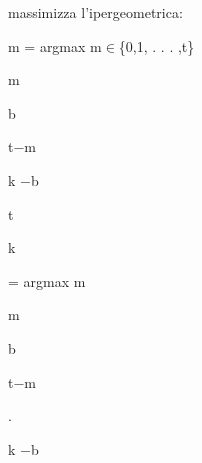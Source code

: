 \documentclass[a4paper,portrait,12pt]{article}
\begin{document}
\begin{flushleft}
massimizza l'ipergeometrica:
\end{flushleft}


\begin{flushleft}
m = argmax m$\in$\{0,1, . . . ,t\}
\end{flushleft}





\begin{flushleft}
m
\end{flushleft}


\begin{flushleft}
b
\end{flushleft}





\begin{flushleft}
t$-$m
\end{flushleft}


\begin{flushleft}
k $-$b
\end{flushleft}


\begin{flushleft}
t
\end{flushleft}


\begin{flushleft}
k
\end{flushleft}





\begin{flushleft}
= argmax m
\end{flushleft}





\begin{flushleft}
m
\end{flushleft}


\begin{flushleft}
b
\end{flushleft}





\begin{flushleft}
t$-$m
\end{flushleft}


.


\begin{flushleft}
k $-$b
\end{flushleft}
\end{document}

